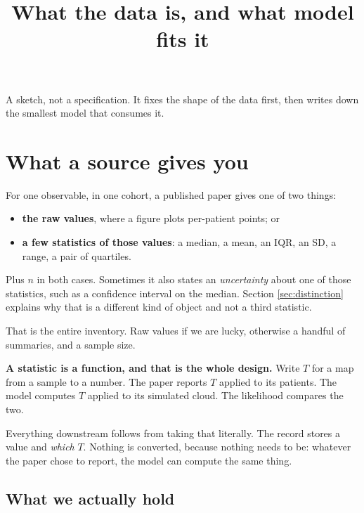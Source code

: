 \documentclass[11pt]{article}
\title{\bfseries What the data is, and what model fits it}
\author{}
\date{}
\begin{document}
\maketitle
\vspace{-2.5em}

\begin{center}\small\color{softgray}
A sketch, not a specification. It fixes the shape of the data first, then writes
down the smallest model that consumes it.
\end{center}

\section{What a source gives you}

For one observable, in one cohort, a published paper gives one of two things:

\begin{itemize}
\item \textbf{the raw values}, where a figure plots per-patient points; or
\item \textbf{a few statistics of those values}: a median, a mean, an IQR, an SD,
      a range, a pair of quartiles.
\end{itemize}

Plus $n$ in both cases. Sometimes it also states an \emph{uncertainty} about one
of those statistics, such as a confidence interval on the median. Section
\ref{sec:distinction} explains why that is a different kind of object and not a
third statistic.

That is the entire inventory. Raw values if we are lucky, otherwise a handful of
summaries, and a sample size.

\begin{notebox}
\textbf{A statistic is a function, and that is the whole design.} Write $T$ for a
map from a sample to a number. The paper reports $T$ applied to its patients. The
model computes $T$ applied to its simulated cloud. The likelihood compares the
two.

Everything downstream follows from taking that literally. The record stores a
value and \emph{which} $T$. Nothing is converted, because nothing needs to be:
whatever the paper chose to report, the model can compute the same thing.
\end{notebox}

\subsection*{What we actually hold}
\end{document}
